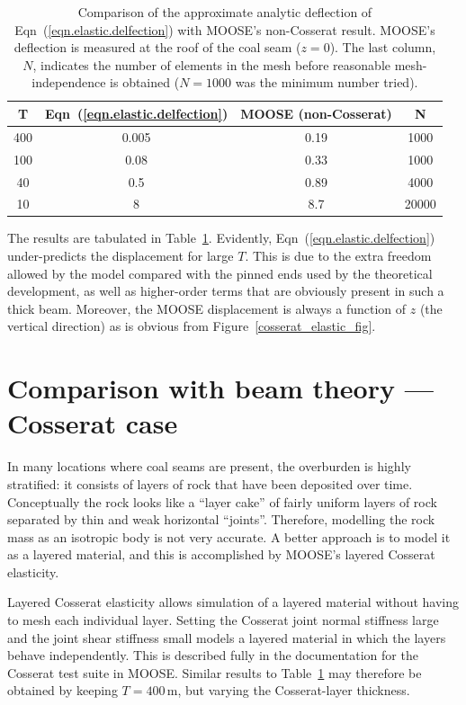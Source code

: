 \documentclass[]{scrreprt}
\begin{document}
\begin{table}[htb]
\begin{center}
\begin{tabular}{cccc}
  T & Eqn~(\ref{eqn.elastic.delfection}) & MOOSE (non-Cosserat) & N \\
  \hline
  400 & 0.005 & 0.19 & 1000 \\
  100 & 0.08 & 0.33 & 1000 \\
  40 & 0.5 & 0.89 & 4000 \\
  10 & 8 & 8.7 & 20000\\
\end{tabular}
\caption{Comparison of the approximate analytic deflection of
  Eqn~(\ref{eqn.elastic.delfection}) with MOOSE's non-Cosserat
  result.  MOOSE's deflection is measured at the roof of the coal seam
  ($z=0$).  The last column, $N$, indicates the number of elements in
  the mesh before reasonable mesh-independence is obtained  ($N=1000$ was the
  minimum number tried).}
\label{elastic.deform.standard}
\end{center}
\end{table}

The results are tabulated in Table~\ref{elastic.deform.standard}.
Evidently, Eqn~(\ref{eqn.elastic.delfection}) under-predicts the
displacement for large $T$.  This is due to the extra freedom allowed
by the model compared with the pinned ends used by the theoretical
development, as well as higher-order terms that are obviously present
in such a thick beam.  Moreover, the MOOSE displacement is always a
function of $z$ (the vertical direction) as is obvious from
Figure~\ref{cosserat_elastic_fig}.

\section{Comparison with beam theory --- Cosserat case}

In many locations where coal seams are present, the overburden is
highly stratified: it consists of layers of rock that have been
deposited over time.  Conceptually the rock looks like a ``layer
cake'' of fairly uniform layers of rock separated by thin and weak
horizontal ``joints''.  Therefore, modelling the rock mass as an
isotropic body is not very accurate.  A better approach is to model it
as a layered material, and this is accomplished by MOOSE's layered
Cosserat elasticity.

Layered Cosserat elasticity allows simulation of a layered material
without having to mesh each individual layer.  Setting the Cosserat
joint normal stiffness large and the joint shear stiffness small
models a layered material in which the layers behave independently.
This is described fully in the documentation for the Cosserat test
suite in MOOSE.  Similar results to
Table~\ref{elastic.deform.standard} may therefore be obtained by
keeping $T=400$\,m, but varying the Cosserat-layer thickness.
\end{document}

